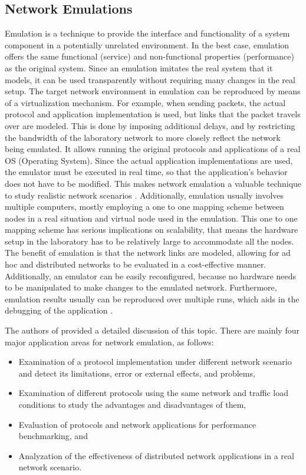 \subsection{Network Emulations}
Emulation is a technique to provide the interface and functionality of a system component in a potentially unrelated environment. In the best case, emulation offers the same functional (service) and non-functional properties (performance) as the original system. Since an emulation imitates the real system that it models, it can be used transparently without requiring many changes in the real setup. The target network environment in emulation can be reproduced by means of a virtualization mechanism. For example, when sending packets, the actual protocol and application implementation is used, but links that the packet travels over are modeled. This is done by imposing additional delays, and by restricting the bandwidth of the laboratory network to more closely reflect the network being emulated. It allows running the original protocols and applications of a real OS (Operating System). Since the actual application implementations are used, the emulator must be executed in real time, so that the application's behavior does not have to be modified. This makes network emulation a valuable technique to study realistic network scenarios \cite{Zheng2012}. Additionally, emulation usually involves multiple computers, mostly employing a one to one mapping scheme between nodes in a real situation and virtual node used in the emulation. This one to one mapping scheme has serious implications on scalability, that means the hardware setup in the laboratory has to be relatively large to accommodate all the nodes. The benefit of emulation is that the network links are modeled, allowing for ad hoc and distributed networks to be evaluated in a cost-effective manner. Additionally, an emulator can be easily reconfigured, because no hardware needs to be manipulated to make changes to the emulated network. Furthermore, emulation results usually can be reproduced over multiple runs, which aids in the debugging of the application \cite{Noble:1997:TMN:263109.263140} \cite{Lochin2012}.

The authors of \cite{eoeqofohn} provided a detailed discussion of this topic. There are mainly four major application areas for network emulation, as follows: 
\begin{itemize}
	\item Examination of a protocol implementation under different network scenario and detect its limitations, error or external effects, and problems,
	\item Examination of different protocols using the same network and traffic load conditions to study the advantages and disadvantages of them,
	\item Evaluation of protocols and network applications for performance benchmarking, and 
	\item Analyzation of the effectiveness of distributed network applications in a real network scenario.
\end{itemize}

